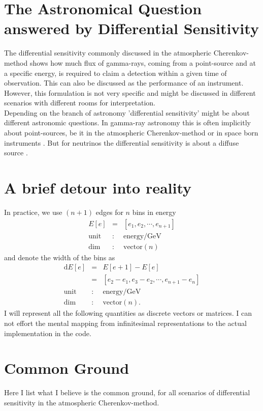 \documentclass{article}%
\begin{document}
\section{The Astronomical Question answered by Differential Sensitivity}
\label{SecAstronomicalQuastion}
The differential sensitivity commonly discussed in the atmospheric Cherenkov-method shows how much flux of gamma-rays, coming from a point-source and at a specific energy, is required to claim a detection within a given time of observation.
%
This can also be discussed as the performance of an instrument.
%
\\
%
However, this formulation is not very specific and might be discussed in different scenarios with different rooms for interpretation.
%
\\
%
Depending on the branch of astronomy 'differential sensitivity' might be about different astronomic questions.
%
In gamma-ray astronomy this is often implicitly about point-sources, be it in the atmospheric Cherenkov-method \cite{cta2018baseline,cortina2016machete} or in space born instruments \cite{wood2016fermiperformance}.
%
But for neutrinos the differential sensitivity is about a diffuse source \cite{marinelli2021km3netarca}.
%
\section{A brief detour into reality}
%
In practice, we use $(n+1)$ edges for $n$ bins in energy
%
\begin{eqnarray*}
E[e] &=& [e_1, e_2, \cdots, e_{n+1}]\\
\text{unit} &:& \text{energy} / \text{GeV}\\
\text{dim} &:& \text{vector}(n)
\end{eqnarray*}
%
and denote the width of the bins as
%
\begin{eqnarray*}
\text{d}E[e] &=& E[e+1] - E[e]\\
&=& [e_2-e_1, e_3-e_2, \cdots, e_{n+1}-e_n]\\
\text{unit} &:& \text{energy} / \text{GeV}\\
\text{dim} &:& \text{vector}(n).
\end{eqnarray*}
%
I will represent all the following quantities as discrete vectors or matrices.
%
I can not effort the mental mapping from infinitesimal representations to the actual implementation in the code.
%
\section{Common Ground}
\label{SecCommonGround}
%
Here I list what I believe is the common ground, for all scenarios of differential sensitivity in the atmospheric Cherenkov-method.
%
\end{document}
